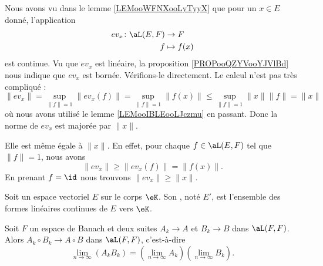 \begin{example}     \label{EXooTQPEooRRdddt}
    Nous avons vu dans le lemme \ref{LEMooWFNXooLyTyyX} que pour un \( x\in E\) donné, l'application
    \begin{equation}
        \begin{aligned}
            ev_x\colon \aL(E,F)&\to F \\
            f&\mapsto f(x) 
        \end{aligned}
    \end{equation}
    est continue. Vu que \( ev_x\) est linéaire, la proposition \ref{PROPooQZYVooYJVlBd} nous indique que \( ev_x\) est bornée. Vérifions-le directement. Le calcul n'est pas très compliqué :
    \begin{equation}
        \| ev_x \|=\sup_{\| f \|=1}\| ev_x(f) \|=\sup_{\| f \|=1}\| f(x) \|\leq \sup_{\| f \|=1}\| x \|\| f \|=\| x \|
    \end{equation}
    où nous avons utilisé le lemme \ref{LEMooIBLEooLJczmu} en passant. Donc la norme de \( ev_x\) est majorée par \( \| x \|\).

    Elle est même égale à \( \| x \|\). En effet, pour chaque \( f\in \aL(E,F)\) tel que \(  \| f \|=1\), nous avons
    \begin{equation}
        \| ev_x \|\geq \| ev_x(f) \|=\| f(x) \|.
    \end{equation}
    En prenant \( f=\id\) nous trouvons \(  \| ev_x \|\geq \| x \|  \).
\end{example}

\begin{definition}      \label{DEFooKSDFooGIBtrG}
    Soit un espace vectoriel \( E\) sur le corps \( \eK\). Son , noté \( E'\), est l'ensemble des formes linéaires continues de \( E\) vers \( \eK\).
\end{definition}

\begin{lemma}   \label{LemWWXVSae}
Soit \( F\) un espace de Banach et deux suites \( A_k\to A\) et \( B_k\to B\) dans \( \aL(F,F)\). Alors \( A_k\circ B_k\to A\circ B\) dans \( \aL(F,F)\), c'est-à-dire
\begin{equation}
    \lim_{n\to \infty} (A_kB_k)=\left( \lim_{n\to \infty} A_k \right)\left( \lim_{n\to \infty} B_k \right).
\end{equation}
\end{lemma}

